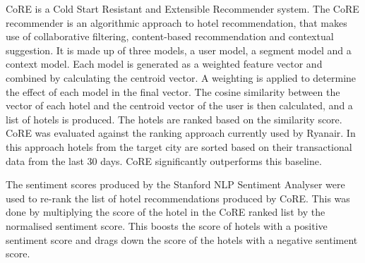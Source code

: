 CoRE \cite{core2019} is a Cold Start Resistant and Extensible Recommender system. The CoRE recommender is an algorithmic approach to hotel recommendation, that makes use of collaborative filtering, content-based recommendation and contextual suggestion. It is made up of three models, a user model, a segment model and a context model. Each model is generated as a weighted feature vector and combined by calculating the centroid vector. A weighting is applied to determine the effect of each model in the final vector. The cosine similarity between the vector of each hotel and the centroid vector of the user is then calculated, and a list of hotels is produced. The hotels are ranked based on the similarity score. CoRE was evaluated against the ranking approach currently used by Ryanair. In this approach hotels from the target city are sorted based on their transactional data from the last 30 days. CoRE significantly outperforms this baseline.

The sentiment scores produced by the Stanford NLP Sentiment Analyser were used to re-rank the list of hotel recommendations produced by CoRE. This was done by multiplying the score of the hotel in the CoRE ranked list by the normalised sentiment score. This boosts the score of hotels with a positive sentiment score and drags down the score of the hotels with a negative sentiment score.